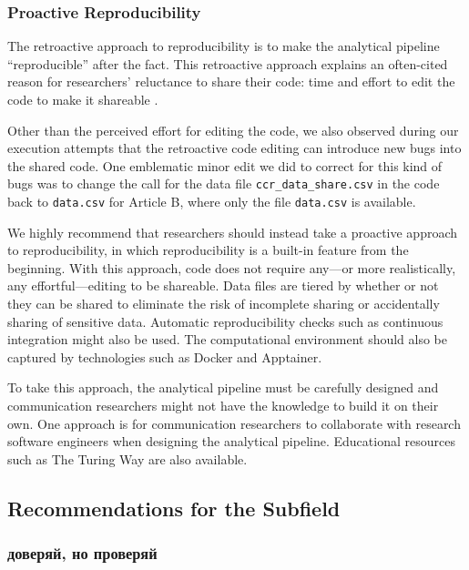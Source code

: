 \subsubsection{Proactive Reproducibility}

The retroactive approach to reproducibility is to make the analytical pipeline ``reproducible'' after the fact. This retroactive approach explains an often-cited reason for researchers' reluctance to share their code: time and effort to edit the code to make it shareable \parencite[]{ch-srcscrpainp-22}.

Other than the perceived effort for editing the code, we also observed during our execution attempts that the retroactive code editing can introduce new bugs into the shared code. One emblematic minor edit we did to correct for this kind of bugs was to change the call for the data file \texttt{ccr\_data\_share.csv} in the code back to \texttt{data.csv} for Article B, where only the file \texttt{data.csv} is available.

We highly recommend that researchers should instead take a proactive approach to reproducibility, in which reproducibility is a built-in feature from the beginning. With this approach, code does not require any---or more realistically, any effortful---editing to be shareable. Data files are tiered by whether or not they can be shared to eliminate the risk of incomplete sharing or accidentally sharing of sensitive data. Automatic reproducibility checks such as continuous integration might also be used. The computational environment should also be captured by technologies such as Docker and Apptainer.

To take this approach, the analytical pipeline must be carefully designed and communication researchers might not have the knowledge to build it on their own. One approach is for communication researchers to collaborate with research software engineers when designing the analytical pipeline. Educational resources such as The Turing Way \parencite[]{The_Turing_Way:2022} are also available.

\subsection{Recommendations for the Subfield}
\label{subsec:recssubfield}

\subsubsection{доверяй, но проверяй}

